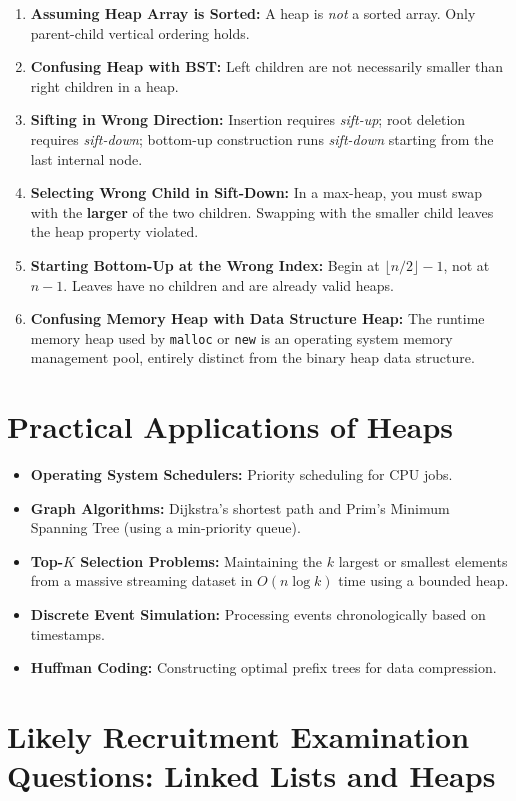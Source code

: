 \begin{enumerate}
    \item \textbf{Assuming Heap Array is Sorted:} A heap is \emph{not} a sorted array. Only parent-child vertical ordering holds.
    \item \textbf{Confusing Heap with BST:} Left children are not necessarily smaller than right children in a heap.
    \item \textbf{Sifting in Wrong Direction:} Insertion requires \emph{sift-up}; root deletion requires \emph{sift-down}; bottom-up construction runs \emph{sift-down} starting from the last internal node.
    \item \textbf{Selecting Wrong Child in Sift-Down:} In a max-heap, you must swap with the \textbf{larger} of the two children. Swapping with the smaller child leaves the heap property violated.
    \item \textbf{Starting Bottom-Up at the Wrong Index:} Begin at $\lfloor n/2 \rfloor - 1$, not at $n-1$. Leaves have no children and are already valid heaps.
    \item \textbf{Confusing Memory Heap with Data Structure Heap:} The runtime memory heap used by \texttt{malloc} or \texttt{new} is an operating system memory management pool, entirely distinct from the binary heap data structure.
\end{enumerate}

\section{Practical Applications of Heaps}
\begin{itemize}
    \item \textbf{Operating System Schedulers:} Priority scheduling for CPU jobs.
    \item \textbf{Graph Algorithms:} Dijkstra's shortest path and Prim's Minimum Spanning Tree (using a min-priority queue).
    \item \textbf{Top-$K$ Selection Problems:} Maintaining the $k$ largest or smallest elements from a massive streaming dataset in $O(n \log k)$ time using a bounded heap.
    \item \textbf{Discrete Event Simulation:} Processing events chronologically based on timestamps.
    \item \textbf{Huffman Coding:} Constructing optimal prefix trees for data compression.
\end{itemize}

\section{Likely Recruitment Examination Questions: Linked Lists and Heaps}

